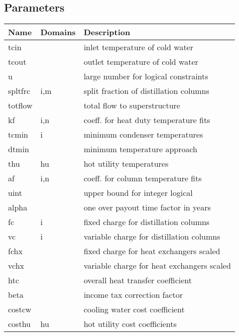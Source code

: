 \documentclass[11pt]{article}
\begin{document}
\subsection*{Parameters}
\begin{tabularx}{\textwidth}{| l | l | X |}
\hline
\textbf{Name} & \textbf{Domains} & \textbf{Description}\\
\hline
\endhead

tcin &  & inlet temperature of cold water\\
tcout &  & outlet temperature of cold water\\
u &  & large number for logical constraints\\
spltfrc & i,m & split fraction of distillation columns\\
totflow &  & total flow to superstructure\\
kf & i,n & coeff. for heat duty temperature fits\\
tcmin & i & minimum condenser temperatures\\
dtmin &  & minimum temperature approach\\
thu & hu & hot utility temperatures\\
af & i,n & coeff. for column temperature fits\\
uint &  & upper bound for integer logical\\
alpha &  & one over payout time factor in years\\
fc & i & fixed charge for distillation columns\\
vc & i & variable charge for distillation columns\\
fchx &  & fixed charge for heat exchangers scaled\\
vchx &  & variable charge for heat exchangers scaled\\
htc &  & overall heat transfer coefficient\\
beta &  & income tax correction factor\\
costcw &  & cooling water cost coefficient\\
costhu & hu & hot utility cost coefficients\\
\hline
\end{tabularx}
\end{document}
